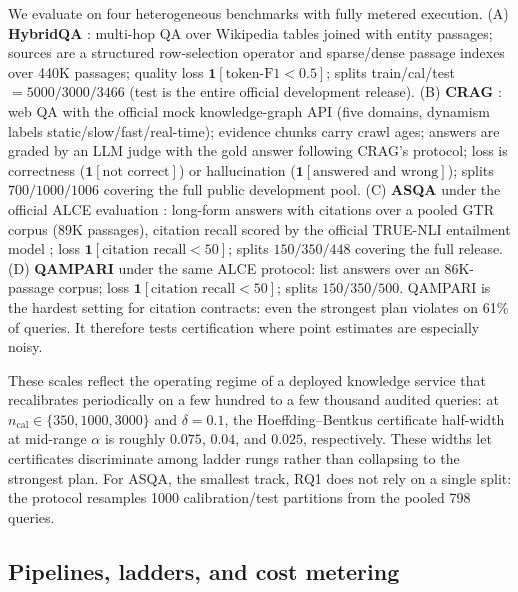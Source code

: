 We evaluate on four heterogeneous benchmarks with fully metered
execution.
(A) \textbf{HybridQA} \citep{chen2020hybridqa}: multi-hop QA over
Wikipedia tables joined with entity passages; sources are a structured
row-selection operator and sparse/dense passage indexes over 440K
passages; quality loss $\mathbf{1}[\text{token-F1} < 0.5]$; splits
train/cal/test $= 5000/3000/3466$ (test is the entire official
development release).
(B) \textbf{CRAG} \citep{yang2024cragbench}: web QA with the official
mock knowledge-graph API (five domains, dynamism labels
static/slow/fast/real-time); evidence chunks carry crawl ages; answers
are graded by an LLM judge with the gold answer following CRAG's
protocol; loss is correctness ($\mathbf{1}[\text{not correct}]$) or
hallucination ($\mathbf{1}[\text{answered and wrong}]$); splits
$700/1000/1006$ covering the full public development pool.
(C) \textbf{ASQA} \citep{stelmakh2022asqa} under the official ALCE
evaluation \citep{gao2023alce}: long-form answers with citations over a
pooled GTR corpus (89K passages), citation recall scored by the
official TRUE-NLI entailment model \citep{honovich2022true}; loss
$\mathbf{1}[\text{citation recall} < 50]$; splits $150/350/448$
covering the full release.
(D) \textbf{QAMPARI} \citep{amouyal2022qampari} under the same ALCE
protocol: list answers over an 86K-passage corpus; loss
$\mathbf{1}[\text{citation recall} < 50]$; splits $150/350/500$.
QAMPARI is the hardest setting for citation contracts: even the
strongest plan violates on 61\% of queries. It therefore tests
certification where point estimates are especially noisy.

These scales reflect the operating regime of a deployed knowledge
service that recalibrates periodically on a few hundred to a few
thousand audited queries: at
$n_{\mathrm{cal}} \in \{350, 1000, 3000\}$ and $\delta = 0.1$, the
Hoeffding--Bentkus certificate half-width at mid-range $\alpha$ is
roughly $0.075$, $0.04$, and $0.025$, respectively. These widths let certificates
discriminate among ladder rungs rather than collapsing to the strongest
plan. For ASQA, the smallest track, RQ1 does not rely on a single split:
the protocol resamples 1000 calibration/test
partitions from the pooled 798 queries.

\subsection{Pipelines, ladders, and cost metering}
\label{sec:ladders}

